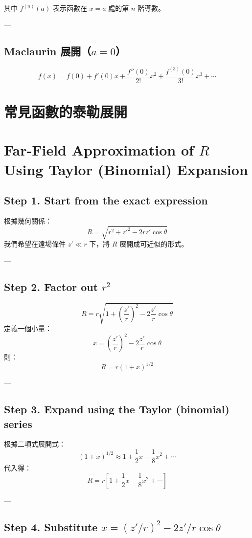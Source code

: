 \documentclass{article}
\def\dfrac#1#2{#1/#2}%
\begin{document}
其中 $f^{(n)}(a)$ 表示函數在 $x=a$ 處的第 $n$ 階導數。

---

\subsection*{Maclaurin 展開（$a=0$）}

\[
f(x) = f(0) + f'(0)x + \frac{f''(0)}{2!}x^2 + \frac{f^{(3)}(0)}{3!}x^3 + \cdots
\]
\section*{常見函數的泰勒展開}
\section*{Far-Field Approximation of $R$ Using Taylor (Binomial) Expansion}

\subsection*{Step 1. Start from the exact expression}

根據幾何關係：
\[
R = \sqrt{r^2 + z'^2 - 2r z' \cos\theta}
\]
我們希望在遠場條件 $z' \ll r$ 下，將 $R$ 展開成可近似的形式。

---

\subsection*{Step 2. Factor out $r^2$}

\[
R = r \sqrt{1 + \left(\frac{z'}{r}\right)^2 - 2\frac{z'}{r}\cos\theta}
\]
定義一個小量：
\[
x = \left(\frac{z'}{r}\right)^2 - 2\frac{z'}{r}\cos\theta
\]
則：
\[
R = r(1 + x)^{1/2}
\]

---

\subsection*{Step 3. Expand using the Taylor (binomial) series}

根據二項式展開式：
\[
(1+x)^{1/2} \approx 1 + \frac{1}{2}x - \frac{1}{8}x^2 + \cdots
\]
代入得：
\[
R = r\left[1 + \frac{1}{2}x - \frac{1}{8}x^2 + \cdots \right]
\]

---

\subsection*{Step 4. Substitute $x = \left(\dfrac{z'}{r}\right)^2 - 2\dfrac{z'}{r}\cos\theta$}
\end{document}
